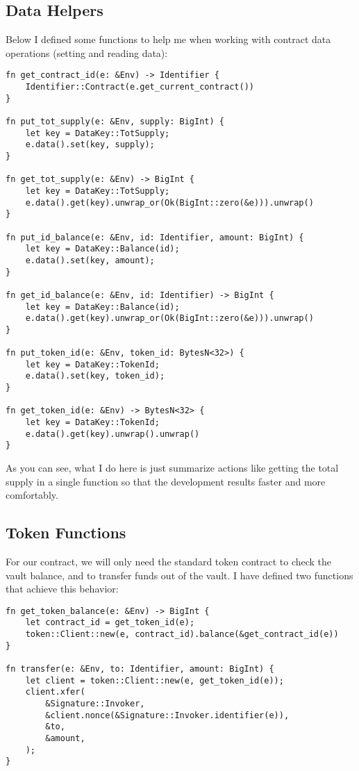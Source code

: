 \documentclass{article}
\begin{document}
\subsection{Data Helpers}
Below I defined some functions to help me when working with contract data operations (setting and reading data):

\begin{lstlisting}
fn get_contract_id(e: &Env) -> Identifier {
    Identifier::Contract(e.get_current_contract())
}

fn put_tot_supply(e: &Env, supply: BigInt) {
    let key = DataKey::TotSupply;
    e.data().set(key, supply);
}

fn get_tot_supply(e: &Env) -> BigInt {
    let key = DataKey::TotSupply;
    e.data().get(key).unwrap_or(Ok(BigInt::zero(&e))).unwrap()
}

fn put_id_balance(e: &Env, id: Identifier, amount: BigInt) {
    let key = DataKey::Balance(id);
    e.data().set(key, amount);
}

fn get_id_balance(e: &Env, id: Identifier) -> BigInt {
    let key = DataKey::Balance(id);
    e.data().get(key).unwrap_or(Ok(BigInt::zero(&e))).unwrap()
}

fn put_token_id(e: &Env, token_id: BytesN<32>) {
    let key = DataKey::TokenId;
    e.data().set(key, token_id);
}

fn get_token_id(e: &Env) -> BytesN<32> {
    let key = DataKey::TokenId;
    e.data().get(key).unwrap().unwrap()
}
\end{lstlisting}

As you can see, what I do here is just summarize actions like getting the total supply in a single function so that the development results faster and more comfortably.

\subsection{Token Functions}
For our contract, we will only need the standard token contract to check the vault balance, and to transfer funds out of the vault. I have defined two functions that achieve this behavior:

\begin{lstlisting}
fn get_token_balance(e: &Env) -> BigInt {
    let contract_id = get_token_id(e);
    token::Client::new(e, contract_id).balance(&get_contract_id(e))
}

fn transfer(e: &Env, to: Identifier, amount: BigInt) {
    let client = token::Client::new(e, get_token_id(e));
    client.xfer(
        &Signature::Invoker,
        &client.nonce(&Signature::Invoker.identifier(e)),
        &to,
        &amount,
    );
}
\end{lstlisting}
\end{document}
